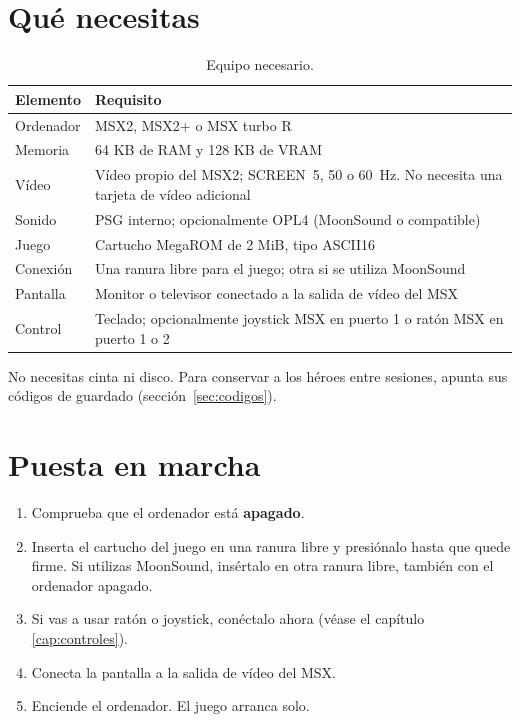 \chapter{Qué necesitas}


\begin{table}[H]\centering\small
\begin{tabularx}{\linewidth}{@{}lL@{}}
\toprule
\textbf{Elemento} & \textbf{Requisito}\\
\midrule
Ordenador & MSX2, MSX2+ o MSX turbo R\\
Memoria & 64 KB de RAM y 128 KB de VRAM\\
Vídeo & Vídeo propio del MSX2; SCREEN~5, 50 o 60~Hz.
No necesita una tarjeta de vídeo adicional\\
Sonido & PSG interno; opcionalmente OPL4 (MoonSound o compatible)\\
Juego & Cartucho MegaROM de 2 MiB, tipo ASCII16\\
Conexión & Una ranura libre para el juego; otra si se utiliza MoonSound\\
Pantalla & Monitor o televisor conectado a la salida de vídeo del MSX\\
Control & Teclado; opcionalmente joystick MSX en puerto 1 o ratón MSX
en puerto 1 o 2\\
\bottomrule
\end{tabularx}
\caption{Equipo necesario.}
\end{table}

No necesitas cinta ni disco. Para conservar a los héroes entre sesiones,
apunta sus códigos de guardado (sección~\ref{sec:codigos}).

\chapter{Puesta en marcha}


\begin{enumerate}
\item Comprueba que el ordenador está \textbf{apagado}.
\item Inserta el cartucho del juego en una ranura libre y presiónalo
      hasta que quede firme. Si utilizas MoonSound, insértalo en otra
      ranura libre, también con el ordenador apagado.
\item Si vas a usar ratón o joystick, conéctalo ahora (véase el capítulo
      \ref{cap:controles}).
\item Conecta la pantalla a la salida de vídeo del MSX.
\item Enciende el ordenador. El juego arranca solo.
\end{enumerate}

